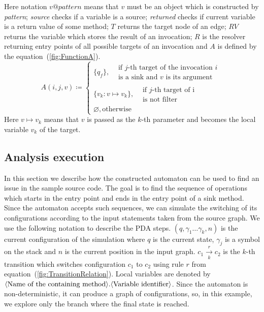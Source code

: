 Here notation $v@\textit{pattern}$ means that $v$ must be an object which is constructed by \textit{pattern}; \textit{source} checks if a variable is a source; \textit{returned} checks if current variable is a return value of some method; $T$ returns the target node of an edge; $RV$ returns the variable which stores the result of an invocation; $R$ is the resolver returning entry points of all possible targets of an invocation and $A$ is defined by the equation~(\ref{fig:FunctionA}).
\begin{equation}
    \label{fig:FunctionA}
    A(i, j, v) \coloneqq
    \begin{cases}
        \{q_f\},  \begin{split}&\textrm{if $j$-th target of the invocation $i$} \\ & \textrm{is a sink and $v$ is its argument}\end{split} \\
            \{v_k: v \mapsto v_k\}, \begin{split}&\textrm{if $j$-th target of i} \\ & \textrm{is not filter}\end{split} \\
        \varnothing, \textrm{otherwise}
    \end{cases}
\end{equation}
Here $v \mapsto v_k$ means that $v$ is passed as the $k$-th parameter and becomes the local variable $v_k$ of the target.

\subsection{Analysis execution}

In this section we describe how the constructed automaton can be used to find an issue in the sample source code.
The goal is to find the sequence of operations which starts in the entry point and ends in the entry point of a sink method.
Since the automaton accepts such sequences, we can simulate the switching of its configurations according to the input statements taken from the source graph.
We use the following notation to describe the PDA steps.
$(q, \gamma_1 \ldots \gamma_k, n)$ is the current configuration of the simulation where $q$ is the current state, $\gamma_j$ is a symbol on the stack and $n$ is the current position in the input graph.
$c_1 \xrightarrow[k]{r} c_2$ is the $k$-th transition which switches configuration $c_1$ to $c_2$ using rule $r$ from equation~(\ref{fig:TransitionRelation}).
Local variables are denoted by $\text{\textlangle{}Name of the containing method\textrangle{}}.\text{\textlangle{}Variable identifier\textrangle{}}$.
Since the automaton is non-deterministic, it can produce a graph of configurations, so, in this example, we explore only the branch where the final state is reached.

